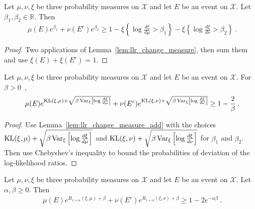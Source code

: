 \begin{lemma}
  \label{lem:llr_change_measure_add}
  \leanok
  Let $\mu, \nu, \xi$ be three probability measures on $\mathcal X$ and let $E$ be an event on $\mathcal X$. Let $\beta_1, \beta_2 \in \mathbb{R}$. Then
  \begin{align*}
  \mu(E) e^{\beta_1} + \nu(E^c) e^{\beta_2} \ge 1 - \xi\left\{ \log\frac{d \xi}{d \mu} > \beta_1 \right\} - \xi\left\{ \log\frac{d \xi}{d \nu} > \beta_2 \right\} \: .
  \end{align*}
\end{lemma}

\begin{proof}\leanok
{}
Two applications of Lemma~\ref{lem:llr_change_measure}, then sum them and use $\xi(E)+\xi(E^c) = 1$.
\end{proof}

\begin{lemma}
  \label{lem:change_measure_variance_add}
  \uses{}
  Let $\mu, \nu, \xi$ be three probability measures on $\mathcal X$ and let $E$ be an event on $\mathcal X$. For $\beta > 0$~,
  \begin{align*}
  \mu(E) e^{\operatorname{KL}(\xi, \mu) + \sqrt{\beta \operatorname{Var}_{\xi}\left[\log\frac{d\xi}{d\mu}\right]}} + \nu(E^c) e^{\operatorname{KL}(\xi, \nu) + \sqrt{\beta \operatorname{Var}_{\xi}\left[\log\frac{d\xi}{d\nu}\right]}}
  \ge 1 - \frac{2}{\beta} \: .
  \end{align*}
\end{lemma}

\begin{proof} %
{}
Use Lemma~\ref{lem:llr_change_measure_add} with the choices $\operatorname{KL}(\xi, \mu) + \sqrt{\beta \operatorname{Var}_{\xi}\left[\log\frac{d\xi}{d\mu}\right]}$ and $\operatorname{KL}(\xi, \nu) + \sqrt{\beta \operatorname{Var}_{\xi}\left[\log\frac{d\xi}{d\nu}\right]}$ for $\beta_1$ and $\beta_2$.
Then use Chebyshev's inequality to bound the probabilities of deviation of the log-likelihood ratios.
\end{proof}

\begin{lemma}
  \label{lem:renyi_change_measure_add}
  \leanok
  Let $\mu, \nu, \xi$ be three probability measures on $\mathcal X$ and let $E$ be an event on $\mathcal X$. Let $\alpha, \beta \ge 0$. Then
  \begin{align*}
  \mu(E) e^{R_{1+\alpha}(\xi, \mu) + \beta} + \nu(E^c) e^{R_{1+\alpha}(\xi, \nu) + \beta} \ge 1 - 2 e^{-\alpha \beta} \: .
  \end{align*}
\end{lemma}

